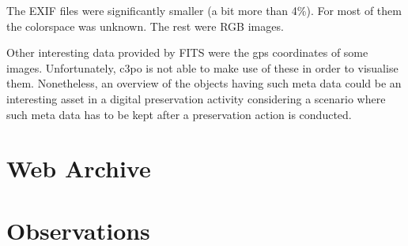 The EXIF files were significantly smaller (a bit more than 4\%). For most of them the colorspace was unknown. The rest were RGB images.

Other interesting data provided by FITS were the gps coordinates of some images. Unfortunately, c3po is not able to make use of these in order to visualise them. Nonetheless, an overview of the objects having such meta data could be an interesting asset in a digital preservation activity considering a scenario where such meta data has to be kept after a preservation action is conducted. 

\section{Web Archive}

\section{Observations}